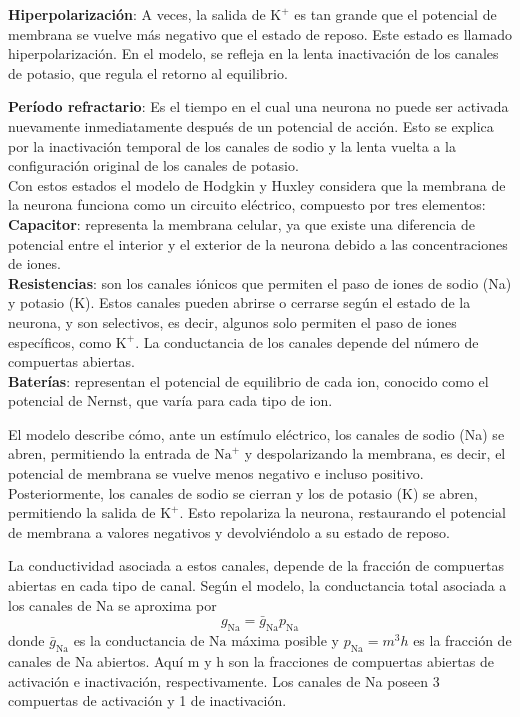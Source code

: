 \documentclass[aps,prl,twocolumn,groupedaddress]{revtex4-2}
\begin{document}
\textbf{Hiperpolarización}: A veces, la salida de $\mathrm{K}^+$ es tan grande que el potencial de membrana se vuelve más negativo que el estado de reposo. Este estado es llamado hiperpolarización. En el modelo, se refleja en la lenta inactivación de los canales de potasio, que regula el retorno al equilibrio.

\textbf{Período refractario}: Es el tiempo en el cual una neurona no puede ser activada nuevamente inmediatamente después de un potencial de acción. Esto se explica por la inactivación temporal de los canales de sodio y la lenta vuelta a la configuración original de los canales de potasio.\\

Con estos estados el modelo de Hodgkin y Huxley considera que la membrana de la neurona funciona como un circuito eléctrico, compuesto por tres elementos:\\

\textbf{Capacitor}: representa la membrana celular, ya que existe una diferencia de potencial entre el interior y el exterior de la neurona debido a las concentraciones de iones.\\

\textbf{Resistencias}: son los canales iónicos que permiten el paso de iones de sodio (Na) y potasio (K). Estos canales pueden abrirse o cerrarse según el estado de la neurona, y son selectivos, es decir, algunos solo permiten el paso de iones específicos, como $\mathrm{K}^+$. La conductancia de los canales depende del número de compuertas abiertas.\\

\textbf{Baterías}: representan el potencial de equilibrio de cada ion, conocido como el potencial de Nernst, que varía para cada tipo de ion.

El modelo describe cómo, ante un estímulo eléctrico, los canales de sodio (Na) se abren, permitiendo la entrada de $\mathrm{Na}^+$ y despolarizando la membrana, es decir, el potencial de membrana se vuelve menos negativo e incluso positivo. Posteriormente, los canales de sodio se cierran y los de potasio (K) se abren, permitiendo la salida de $\mathrm{K}^+$. Esto repolariza la neurona, restaurando el potencial de membrana a valores negativos y devolviéndolo a su estado de reposo.

La conductividad asociada a estos canales, depende de la fracción de compuertas abiertas en cada tipo de canal. Según el modelo, la conductancia total asociada a los canales de Na se aproxima por
$$g_{\mathrm{Na}} = \bar{g}_{\mathrm{Na}}p_{\mathrm{Na}}$$
donde $\bar{g}_{\mathrm{Na}}$ es la conductancia de $\mathrm{Na}$ máxima posible y $p_{\mathrm{Na}} = m^3h$  es la fracción de canales de Na abiertos. Aquí m y h son la fracciones de compuertas abiertas de activación e inactivación, respectivamente. Los canales de Na poseen 3 compuertas de activación y 1 de inactivación.
\end{document}
